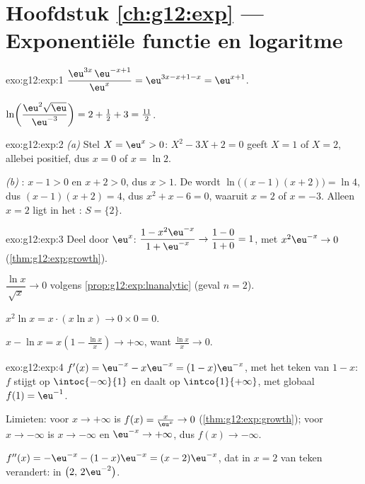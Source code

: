 \section*{Hoofdstuk \ref{ch:g12:exp} --- Exponentiële functie en logaritme}

\begin{solution}{exo:g12:exp:1}
$\dfrac{\eu^{3x}\,\eu^{-x+1}}{\eu^{x}} = \eu^{3x - x + 1 - x} = \eu^{x+1}$.

$\ln\!\left(\dfrac{\eu^2\sqrt{\eu}}{\eu^{-3}}\right)
= 2 + \tfrac12 + 3 = \tfrac{11}{2}$.
\end{solution}

\begin{solution}{exo:g12:exp:2}
\emph{(a)} Stel $X = \eu^x > 0$: $X^2 - 3X + 2 = 0$ geeft $X = 1$ of
$X = 2$, allebei positief, dus $x = 0$ of $x = \ln 2$.

\emph{(b)} : $x - 1 > 0$ en $x + 2 > 0$, dus $x > 1$. De 
wordt $\ln\bigl((x-1)(x+2)\bigr) = \ln 4$, dus $(x-1)(x+2) = 4$, dus
$x^2 + x - 6 = 0$, waaruit $x = 2$ of $x = -3$. Alleen $x = 2$ ligt in het
: $S = \{2\}$.
\end{solution}

\begin{solution}{exo:g12:exp:3}
Deel door $\eu^x$: $\dfrac{1 - x^2\eu^{-x}}{1 + \eu^{-x}} \to
\dfrac{1-0}{1+0} = 1$, met $x^2 \eu^{-x} \to 0$
(\cref{thm:g12:exp:growth}).

$\dfrac{\ln x}{\sqrt x} \to 0$ volgens \cref{prop:g12:exp:lnanalytic} (geval
$n = 2$).

$x^2 \ln x = x \cdot (x \ln x) \to 0 \times 0 = 0$.

$x - \ln x = x\left(1 - \frac{\ln x}{x}\right) \to +\infty$, want
$\frac{\ln x}{x} \to 0$.
\end{solution}

\begin{solution}{exo:g12:exp:4}
$f'(x) = \eu^{-x} - x\eu^{-x} = (1 - x)\eu^{-x}$, met het teken van
$1 - x$: $f$ stijgt op $\intoc{-\infty}{1}$ en daalt op
$\intco{1}{+\infty}$, met globaal  $f(1) = \eu^{-1}$.

Limieten: voor $x \to +\infty$ is $f(x) = \frac{x}{\eu^x} \to 0$
(\cref{thm:g12:exp:growth}); voor $x \to -\infty$ is $x \to -\infty$ en
$\eu^{-x} \to +\infty$, dus $f(x) \to -\infty$.

$f''(x) = -\eu^{-x} - (1-x)\eu^{-x} = (x - 2)\eu^{-x}$, dat in $x = 2$ van
teken verandert:  in $\bigl(2,\, 2\eu^{-2}\bigr)$.
\end{solution}

